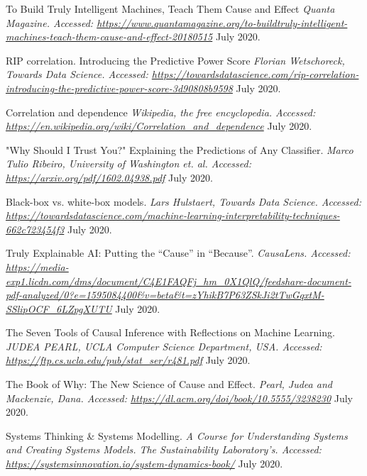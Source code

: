 \let\cleardoublepage\clearpage
\cleardoublepage
{}


\begin{thebibliography}{1}
\vspace*{15pt}


 To Build Truly Intelligent Machines, Teach Them Cause and Effect {\em Quanta Magazine. Accessed:  \url{https://www.quantamagazine.org/to-buildtruly-intelligent-machines-teach-them-cause-and-effect-20180515}} July 2020.

 RIP correlation. Introducing the Predictive Power Score {\em Florian Wetschoreck, Towards Data Science. Accessed:  \url{https://towardsdatascience.com/rip-correlation-introducing-the-predictive-power-score-3d90808b9598}} July 2020.

 Correlation and dependence {\em Wikipedia, the free encyclopedia. Accessed:  \url{https://en.wikipedia.org/wiki/Correlation_and_dependence}} July 2020.

  "Why Should I Trust You?" Explaining the Predictions of Any Classifier. {\em Marco Tulio Ribeiro, University of Washington et. al. Accessed:  \url{https://arxiv.org/pdf/1602.04938.pdf}} July 2020.

 Black-box vs. white-box models. {\em  Lars Hulstaert, Towards Data Science. Accessed:  \url{https://towardsdatascience.com/machine-learning-interpretability-techniques-662c723454f3}} July 2020.

 Truly Explainable AI: Putting the “Cause” in “Because”. {\em  CausaLens. Accessed:  \url{https://media-exp1.licdn.com/dms/document/C4E1FAQFj_hm_0X1QlQ/feedshare-document-pdf-analyzed/0?e=1595084400&v=beta&t=zYhikB7P63ZSkJi2tTwGqxtM-SSlipOCF_6LZpgXUTU}} July 2020.

 The Seven Tools of Causal Inference with Reflections on Machine Learning. {\em JUDEA PEARL, UCLA Computer Science Department, USA. Accessed:  \url{https://ftp.cs.ucla.edu/pub/stat_ser/r481.pdf}} July 2020.

 The Book of Why: The New Science of Cause and Effect. {\em Pearl, Judea and Mackenzie, Dana. Accessed:  \url{https://dl.acm.org/doi/book/10.5555/3238230}} July 2020.

 Systems Thinking & Systems Modelling. {\em A Course for Understanding Systems and Creating Systems Models. The Sustainability Laboratory’s. Accessed:  \url{https://systemsinnovation.io/system-dynamics-book/}} July 2020.


\end{thebibliography}
